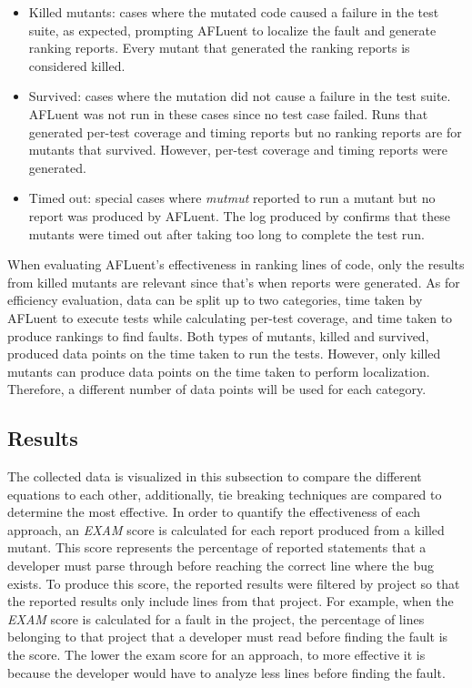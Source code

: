 \begin{itemize}
    \item Killed mutants: cases where the mutated code caused a failure in the
    test suite, as expected, prompting AFLuent to localize the fault and
    generate ranking reports.
    Every mutant that generated the ranking reports is
    considered killed.
    \item Survived: cases where the mutation did not cause a failure in the test
    suite. AFLuent was not run in these cases since no test case failed. Runs
    that generated per-test coverage and timing reports but no ranking reports
    are for mutants that survived.
    However, per-test coverage and timing reports were generated.
    \item Timed out: special cases where \emph{mutmut} reported to run a mutant
    but no report was produced by AFLuent. The log produced by 
    confirms that these mutants were timed out after taking too long to complete
    the test run.
\end{itemize}

When evaluating AFLuent's effectiveness in ranking lines of code, only the
results from killed mutants are relevant since that's when reports were
generated. As for efficiency evaluation, data can be split up to two categories,
time taken by AFLuent to execute tests while calculating per-test coverage, and
time taken to produce rankings to find faults. Both types of mutants, killed and
survived, produced data points on the time taken to run the tests. However, only
killed mutants can produce data points on the time taken to perform
localization. Therefore, a different number of data points will be used for each
category.

\subsection{Results}
\label{subsec:eval_results}

The collected data is visualized in this subsection to compare the different
equations to each other, additionally, tie breaking techniques are compared to
determine the most effective. In order to quantify the effectiveness of each
approach, an \emph{EXAM} \cite{exam_scores}
score is calculated for each report produced from a killed mutant. This score
represents the percentage of reported statements that a developer must parse
through before reaching the correct line where the bug exists. To produce this
score, the reported results were filtered by project so that the reported
results only include lines from that project. For example, when the \emph{EXAM}
score is calculated for a fault in the  project, the
percentage of lines belonging to that project that a developer must read before
finding the fault is the score. The lower the exam score for an approach, to
more effective it is because the developer would have to analyze less lines
before finding the fault.

